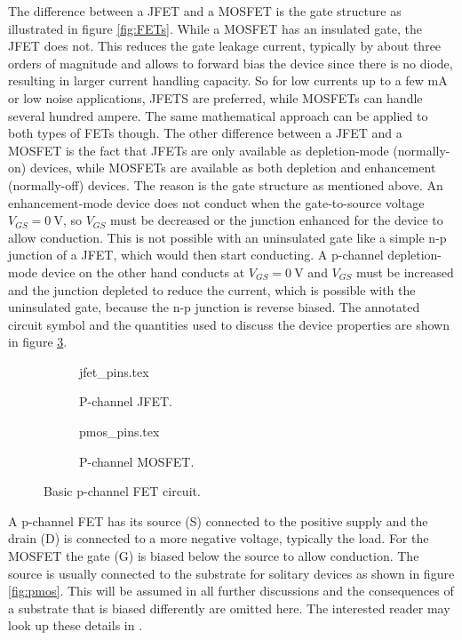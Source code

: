 The difference between a JFET and a MOSFET is the gate structure as illustrated in figure \ref{fig:FETs}. While a MOSFET has an insulated gate, the JFET does not. This reduces the gate leakage current, typically by about three orders of magnitude and allows to forward bias the device since there is no diode, resulting in larger current handling capacity. So for low currents up to a few \unit{\mA} or low noise applications, JFETS are preferred, while MOSFETs can handle several hundred ampere. The same mathematical approach can be applied to both types of FETs though. The other difference between a JFET and a MOSFET is the fact that JFETs are only available as depletion-mode (normally-on) devices, while MOSFETs are available as both depletion and enhancement (normally-off) devices. The reason is the gate structure as mentioned above. An enhancement-mode device does not conduct when the gate-to-source voltage $V_{GS} = \qty{0}{\V}$, so $V_{GS}$ must be decreased or the junction enhanced for the device to allow conduction. This is not possible with an uninsulated gate like a simple n-p junction of a JFET, which would then start conducting. A p-channel depletion-mode device on the other hand conducts at $V_{GS} = \qty{0}{\V}$ and $V_{GS}$ must be increased and the junction depleted to reduce the current, which is possible with the uninsulated gate, because the n-p junction is reverse biased. The annotated circuit symbol and the quantities used to discuss the device properties are shown in figure \ref{fig:fet_symbols}.

\begin{figure}[ht]
    \centering
    \begin{subfigure}{0.4\linewidth}
        \centering
        {jfet_pins.tex}
        \caption{P-channel JFET.}
        \label{fig:fet_symbols_jfet}
    \end{subfigure}
    \begin{subfigure}{0.4\linewidth}
        \centering
        {pmos_pins.tex}
        \caption{P-channel MOSFET.}
        \label{fig:fet_symbols_mosfet}
    \end{subfigure}
    \caption{Basic p-channel FET circuit.}
    \label{fig:fet_symbols}
\end{figure}

A p-channel FET has its source (S) connected to the positive supply and the drain (D) is connected to a more negative voltage, typically the load. For the MOSFET the gate (G) is biased below the source to allow conduction. The source is usually connected to the substrate for solitary devices as shown in figure \ref{fig:pmos}. This will be assumed in all further discussions and the consequences of a substrate that is biased differently are omitted here. The interested reader may look up these details in \cite{mosfet_details}.

